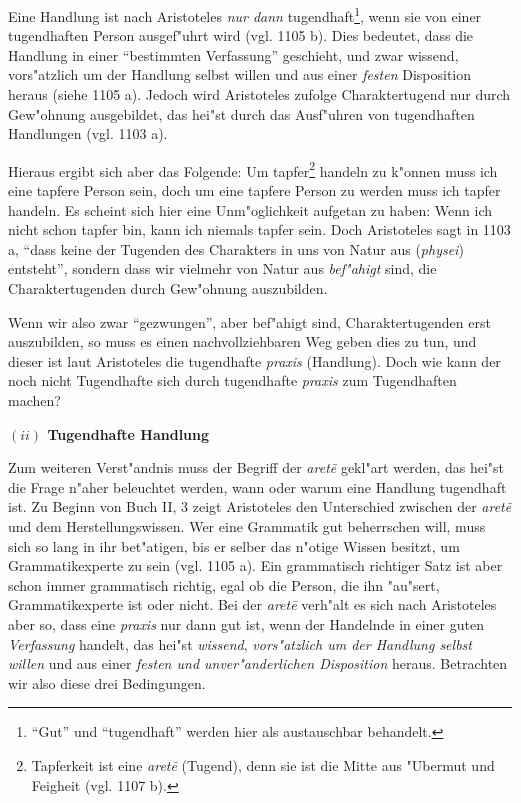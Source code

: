\documentclass[a4paper, emulatestandardclasses, 12pt]{scrartcl}
\begin{document}
\begin{onehalfspace}
Eine Handlung ist nach Aristoteles \emph{nur dann} tugendhaft\footnote{"`Gut"' und "`tugendhaft"' werden hier als austauschbar behandelt.}, wenn sie von einer tugendhaften Person ausgef"uhrt wird (vgl. 1105 b). Dies bedeutet, dass die Handlung in einer "`bestimmten Verfassung"' geschieht, und zwar wissend, vors"atzlich um der Handlung selbst willen und aus einer \emph{festen} Disposition heraus (siehe 1105 a). Jedoch wird Aristoteles zufolge Charaktertugend nur durch Gew"ohnung ausgebildet, das hei"st durch das Ausf"uhren von tugendhaften Handlungen (vgl. 1103 a). 

Hieraus ergibt sich aber das Folgende: Um tapfer\footnote{Tapferkeit ist eine \emph{aret\={e}} (Tugend), denn sie ist die Mitte aus "Ubermut und Feigheit (vgl. 1107 b).} handeln zu k"onnen muss ich eine tapfere Person sein, doch um eine tapfere Person zu werden muss ich tapfer handeln. Es scheint sich hier eine Unm"oglichkeit aufgetan zu haben: Wenn ich nicht schon tapfer bin, kann ich niemals tapfer sein. Doch Aristoteles sagt in 1103 a, "`dass keine der Tugenden des Charakters in uns von Natur aus (\emph{physei}) entsteht"', sondern dass wir vielmehr von Natur aus \emph{bef"ahigt} sind, die Charaktertugenden durch Gew"ohnung auszubilden. 

Wenn wir also zwar "`gezwungen"', aber bef"ahigt sind, Charaktertugenden erst auszubilden, so muss es einen nachvollziehbaren Weg geben dies zu tun, und dieser ist laut Aristoteles die tugendhafte \emph{praxis} (Handlung). Doch wie kann der noch nicht Tugendhafte sich durch tugendhafte \emph{praxis} zum Tugendhaften machen?

\vspace{5mm}
\noindent\textbf{$(ii)$ Tugendhafte Handlung}	

\noindent Zum weiteren Verst"andnis muss der Begriff der \emph{aret\={e}} gekl"art werden, das hei"st die Frage n"aher beleuchtet werden, wann oder warum eine Handlung tugendhaft ist. Zu Beginn von Buch II, 3 zeigt Aristoteles den Unterschied zwischen der \emph{aret\={e}} und dem  Herstellungswissen. Wer eine Grammatik gut beherrschen will, muss sich so lang in ihr bet"atigen, bis er selber das n"otige Wissen besitzt, um Grammatikexperte zu sein (vgl. 1105 a). Ein grammatisch richtiger Satz ist aber schon immer grammatisch richtig, egal ob die Person, die ihn "au"sert, Grammatikexperte ist oder nicht. Bei der \emph{aret\={e}} verh"alt es sich nach Aristoteles aber so, dass eine \emph{praxis} nur dann gut ist, wenn der Handelnde in einer guten \emph{Verfassung} handelt, das hei"st \emph{wissend}, \emph{vors"atzlich um der Handlung selbst willen} und aus einer \emph{festen und unver"anderlichen Disposition} heraus. Betrachten wir also diese drei Bedingungen.


\end{onehalfspace}
\end{document}
